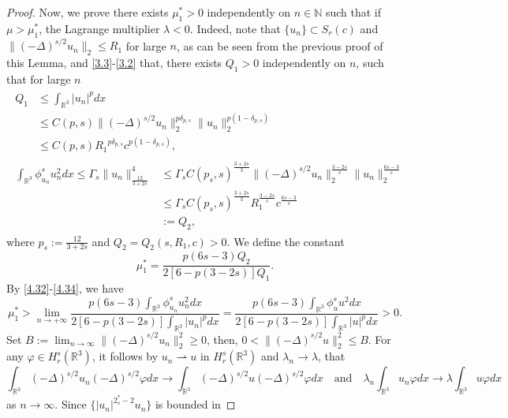 \documentclass[11pt]{article}
\numberwithin{equation}{section}
\begin{document}
\begin{proof}
Now, we prove there exists $\mu^*_1>0$ independently on $n\in \mathbb{N}$ such that if 
$\mu>\mu^*_1$, the Lagrange multiplier $\lambda<0$. Indeed, note that 
$\{u_n\}\subset S_{r}(c)$ and $\|(-\Delta)^{s/2}u_n\|_2\leq R_1$ for large $n$, 
as can be seen from the previous proof of this Lemma, and \eqref{3.3}-\eqref{3.2} that, 
there exists $Q_1>0$ independently on $n$, such that
for large $n$
\begin{gather}\label{4.32}
\begin{split}
Q_1
&\leq \int_{\mathbb{R}^3}|u_n|^pdx \\
&\leq  C(p,s) \|(-\Delta)^{s/2}u_n\|^{p\delta_{p,s}}_2\|u_n\|^{p(1-\delta_{p,s})}_2\\
&\leq  C(p,s) {R_1}^{p\delta_{p,s}}c^{p(1-\delta_{p,s})},
\end{split} \\
\label{4.33}
\begin{split}
\int_{\mathbb{R}^3}\phi^s_{u_n} u^2_ndx\leq \Gamma_s \|u_n\|^4_{\frac{12}{3+2s}}
&\leq  \Gamma_sC(p_s,s)^{\frac{3+2s}{3}}
\|(-\Delta)^{s/2}u_n\|^{\frac{3-2s}{s}}_2\|u_n\|^{\frac{6s-3}{s}}_2\\
&\leq \Gamma_sC(p_s,s)^{\frac{3+2s}{3}}
R^{\frac{3-2s}{s}}_1c^{\frac{6s-3}{s}}\\
&:= Q_2,
\end{split}
\end{gather}
where $p_s:=\frac{12}{3+2s}$ and $Q_2=Q_2(s, R_1, c)>0 $. 
We define the constant
\begin{equation}\label{4.34}
\mu^*_1 =\frac{p(6s-3)Q_2}{2[6-p(3-2s)]Q_1}.
\end{equation}
By \eqref{4.32}-\eqref{4.34}, we have
\begin{equation}\label{4.35}
\mu^*_1 >\lim_{n\to +\infty}\frac{p(6s-3)\int_{\mathbb{R}^3}\phi^s_{u_n} u^2_ndx}
{2[6-p(3-2s)]\int_{\mathbb{R}^3}|u_n|^pdx}
=\frac{p(6s-3)\int_{\mathbb{R}^3}\phi^s_{u} u^2dx}{2[6-p(3-2s)]
\int_{\mathbb{R}^3}|u|^pdx}>0.
\end{equation}
Set $B:=\lim_{n\to \infty} \|(-\Delta)^{s/2}u_n\|^2_2\geq 0$, then, 
$0<\|(-\Delta)^{s/2}u\|^2_2\leq B$. For  any $\varphi \in H^s_{r}(\mathbb{R}^3)$, 
it follows by $u_n\rightharpoonup u$ in $H^s_{r}(\mathbb{R}^3)$ and 
$\lambda_n\to \lambda$, that
$$
\int_{\mathbb{R}^3}(-\Delta)^{s/2}u_n(-\Delta)^{s/2}\varphi dx
 \to \int_{\mathbb{R}^3}(-\Delta)^{s/2}u(-\Delta)^{s/2}\varphi dx 
 \quad \text{and}\quad
\lambda_n\int_{\mathbb{R}^3}u_n\varphi dx\to \lambda\int_{\mathbb{R}^3}u\varphi dx
$$
as $n\to \infty$. Since $\{|u_n|^{2^*_s-2}u_n\}$ is bounded in 

\end{proof}
\end{document}
